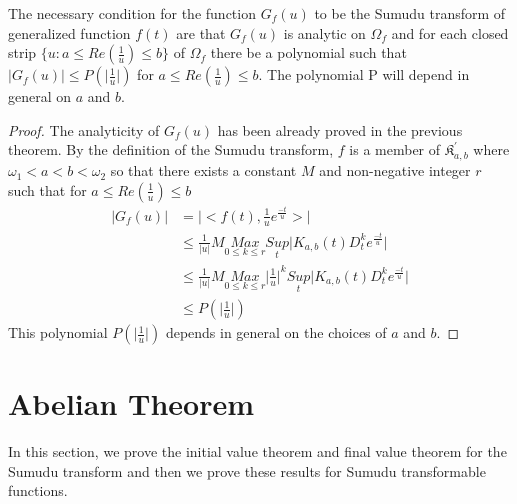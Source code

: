  \begin{theorem}
 The necessary condition for the function $G_{f}(u)$ to be the Sumudu transform of generalized function $f(t)$ are that $G_{f}(u)$ is analytic on $\Omega_{f}$ and for each closed strip $\lbrace u:a\leq Re(\frac{1}{u})\leq b\rbrace $ of $\Omega_{f}$ there be a polynomial such that $\vert G_{f}(u)\vert\leq P(\vert\frac{1}{u}\vert)$ for $a\leq Re(\frac{1}{u})\leq b$. The polynomial P will depend in general on $a$ and $b$.
\end{theorem}

\begin{proof}
 The analyticity of $G_{f}(u)$ has been already proved in the previous theorem. By the definition of the Sumudu transform, $f$ is a member of $\mathfrak{K}_{a,b}^{'}$ where $\omega_{1}<a<b<\omega_{2}$ so that there exists a constant $M$ and non-negative integer $r$ such that for $a\leq Re(\frac{1}{u})\leq b$
 \begin{align*}
 \vert G_{f}(u)\vert &= \vert <f(t),\frac{1}{u}e^{\frac{-t}{u}}>\vert\\
&\leq\frac{1}{\vert u\vert}M \underset{0\leq k\leq r}{Max}\underset{t}{Sup}\vert K_{a,b}(t)D_{t}^{k}e^{\frac{-t}{u}}\vert\\
&\leq\frac{1}{\vert u\vert}M \underset{0\leq k\leq r}{Max}{\vert\frac{1}{u}\vert}^{k}\underset{t}{Sup}\vert K_{a,b}(t)D_{t}^{k}e^{\frac{-t}{u}}\vert\\
&\leq P(\vert\frac{1}{u}\vert)
 \end{align*}
 This polynomial $P(\vert\frac{1}{u}\vert)$ depends in general on the choices of $a$ and $b$.
 \end{proof}
 \section{Abelian Theorem}
 In this section, we prove the initial value theorem and final value theorem for the Sumudu transform and then we prove these results for Sumudu transformable functions.
